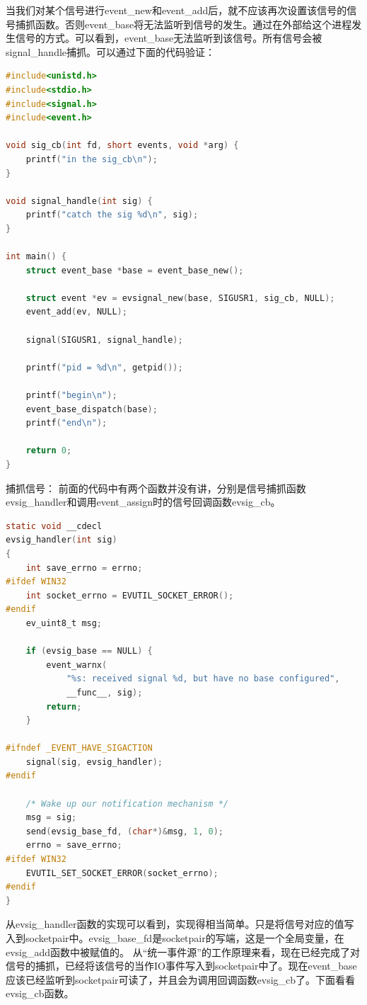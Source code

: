 \documentclass[11pt,a4paper]{article}
\begin{document}
当我们对某个信号进行event\_new和event\_add后，就不应该再次设置该信号的信号捕抓函数。否则event\_base将无法监听到信号的发生。通过在外部给这个进程发生信号的方式。可以看到，event\_base无法监听到该信号。所有信号会被signal\_handle捕抓。可以通过下面的代码验证：
\begin{lstlisting}[language=C]
#include<unistd.h>
#include<stdio.h>
#include<signal.h>
#include<event.h>

void sig_cb(int fd, short events, void *arg) {
    printf("in the sig_cb\n");
}

void signal_handle(int sig) {
    printf("catch the sig %d\n", sig);
}

int main() {
    struct event_base *base = event_base_new();

    struct event *ev = evsignal_new(base, SIGUSR1, sig_cb, NULL);
    event_add(ev, NULL);

    signal(SIGUSR1, signal_handle);

    printf("pid = %d\n", getpid());

    printf("begin\n");
    event_base_dispatch(base);
    printf("end\n");

    return 0;
}
\end{lstlisting}
捕抓信号：
        前面的代码中有两个函数并没有讲，分别是信号捕抓函数evsig\_handler和调用event\_assign时的信号回调函数evsig\_cb。   
\begin{lstlisting}[language=C]
static void __cdecl
evsig_handler(int sig)
{
	int save_errno = errno;
#ifdef WIN32
	int socket_errno = EVUTIL_SOCKET_ERROR();
#endif
	ev_uint8_t msg;

	if (evsig_base == NULL) {
		event_warnx(
			"%s: received signal %d, but have no base configured",
			__func__, sig);
		return;
	}

#ifndef _EVENT_HAVE_SIGACTION
	signal(sig, evsig_handler);
#endif

	/* Wake up our notification mechanism */
	msg = sig;
	send(evsig_base_fd, (char*)&msg, 1, 0);
	errno = save_errno;
#ifdef WIN32
	EVUTIL_SET_SOCKET_ERROR(socket_errno);
#endif
}
\end{lstlisting}
从evsig\_handler函数的实现可以看到，实现得相当简单。只是将信号对应的值写入到socketpair中。evsig\_base\_fd是socketpair的写端，这是一个全局变量，在evsig\_add函数中被赋值的。
        从“统一事件源”的工作原理来看，现在已经完成了对信号的捕抓，已经将该信号的当作IO事件写入到socketpair中了。现在event\_base应该已经监听到socketpair可读了，并且会为调用回调函数evsig\_cb了。下面看看evsig\_cb函数。
\end{document}
